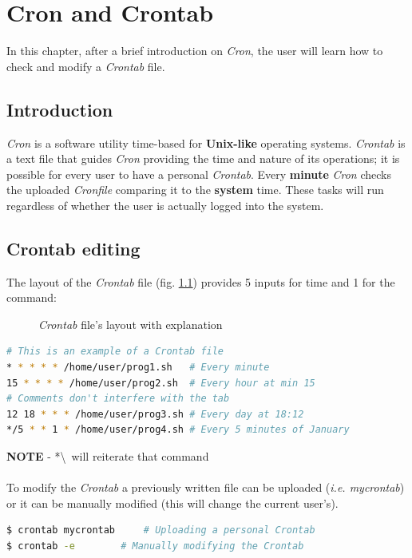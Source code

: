 \documentclass[12pt,a4paper]{report}
\begin{document}
\chapter{Cron and Crontab} \label{cron}
%
In this chapter, after a brief introduction on \textit{Cron}, the user will learn how to check and modify a \textit{Crontab} file.
\section{Introduction}
\textit{Cron} is a software utility time-based for \textbf{Unix-like} operating systems. \textit{Crontab} is a text file that guides \textit{Cron} providing the time and nature of its operations; it is possible for every user to have a personal \textit{Crontab}. Every \textbf{minute} \textit{Cron} checks the uploaded \textit{Cronfile} comparing it to the \textbf{system} time. These tasks will run regardless of whether the user is actually logged into the system.
\section{Crontab editing}
The layout of the \textit{Crontab} file (fig. \ref{crnlay}) provides 5 inputs for time and 1 for the command:
\begin{figure}[h!]
\centering
{}
\caption{\textit{Crontab} file's layout with explanation}
\label{crnlay}
\end{figure}
\begin{lstlisting}[language=bash]
# This is an example of a Crontab file
* * * * * /home/user/prog1.sh	# Every minute
15 * * * * /home/user/prog2.sh	# Every hour at min 15
# Comments don't interfere with the tab
12 18 * * * /home/user/prog3.sh	# Every day at 18:12
*/5 * * 1 * /home/user/prog4.sh	# Every 5 minutes of January
\end{lstlisting} 
\textbf{NOTE} - *\textbackslash \ will reiterate that command \\ \\
To modify the \textit{Crontab} a previously written file can be uploaded (\textit{i.e. mycrontab}) or it can be manually modified (this will change the current user's). \\
\begin{lstlisting}[language=bash]
$ crontab mycrontab 	# Uploading a personal Crontab
$ crontab -e	 	# Manually modifying the Crontab
\end{lstlisting}
\end{document}
